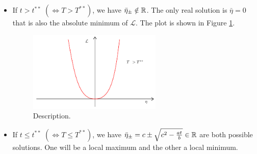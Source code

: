 \documentclass[../main/main.tex]{subfiles}
\begin{document}
\begin{itemize}
\item If \( t> t^{**} \) \( (\iff T > T^ {**}) \), we have  \( \bar{\eta }_\pm \notin \mathbb{R}  \). The only real solution is \( \bar{\eta }=0  \) that is also the absolute minimum of \( \mathcal{L} \). The plot is shown in Figure \ref{fig:16_1}.
\begin{figure}[h!]
\centering
\includegraphics[width=0.6\textwidth]{../lessons/16_image/1.pdf}
\caption{\label{fig:16_1} Description.}
\end{figure}

\item If \( t \le t^{**} \) \( (\iff T \le T^ {**}) \), we have \( \bar{\eta }_\pm = c \pm \sqrt{c^2 - \frac{at}{b}} \in \mathbb{R}  \) are both possible solutions. One will be a local maximum and the other a local minimum.


\end{itemize}
\end{document}

